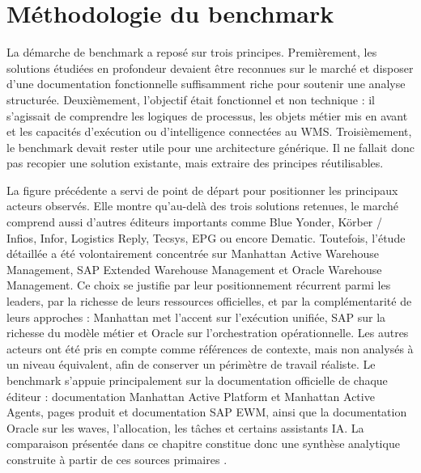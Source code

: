 
\section{Méthodologie du benchmark}

\label{sec:2.2}

La démarche de benchmark a reposé sur trois principes. Premièrement, les solutions étudiées en profondeur devaient être reconnues sur le marché et disposer d’une documentation fonctionnelle suffisamment riche pour soutenir une analyse structurée. Deuxièmement, l’objectif était fonctionnel et non technique : il s’agissait de comprendre les logiques de processus, les objets métier mis en avant et les capacités d’exécution ou d’intelligence connectées au WMS. Troisièmement, le benchmark devait rester utile pour une architecture générique. Il ne fallait donc pas recopier une solution existante, mais extraire des principes réutilisables.




La figure précédente a servi de point de départ pour positionner les principaux acteurs observés. Elle montre qu’au-delà des trois solutions retenues, le marché comprend aussi d’autres éditeurs importants comme Blue Yonder, Körber / Infios, Infor, Logistics Reply, Tecsys, EPG ou encore Dematic. Toutefois, l’étude détaillée a été volontairement concentrée sur Manhattan Active Warehouse Management, SAP Extended Warehouse Management et Oracle Warehouse Management. Ce choix se justifie par leur positionnement récurrent parmi les leaders, par la richesse de leurs ressources officielles, et par la complémentarité de leurs approches : Manhattan met l’accent sur l’exécution unifiée, SAP sur la richesse du modèle métier et Oracle sur l’orchestration opérationnelle. Les autres acteurs ont été pris en compte comme références de contexte, mais non analysés à un niveau équivalent, afin de conserver un périmètre de travail réaliste. Le benchmark s’appuie principalement sur la documentation officielle de chaque éditeur : documentation Manhattan Active Platform et Manhattan Active Agents, pages produit et documentation SAP EWM, ainsi que la documentation Oracle sur les waves, l’allocation, les tâches et certains assistants IA. La comparaison présentée dans ce chapitre constitue donc une synthèse analytique construite à partir de ces sources primaires \cite{ref4,ref5,ref6,ref7,ref8,ref9,ref10}.


